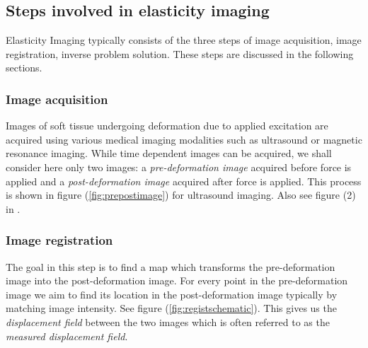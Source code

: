 \documentclass[12pt]{article}
\begin{document}
\subsection{Steps involved in elasticity imaging}
Elasticity Imaging typically consists of the three steps of image acquisition, image registration, inverse problem solution. These steps are discussed in the following sections.
\subsubsection{Image acquisition} Images of soft tissue undergoing deformation due to applied excitation are acquired using various medical imaging modalities such as ultrasound or magnetic resonance imaging. While time dependent images can be acquired, we shall consider here only two images: a \textit{pre-deformation image} acquired before force is applied and a \textit{post-deformation image} acquired after force is applied. This process is shown in figure (\ref{fig:prepostimage}) for ultrasound imaging. Also see figure (2) in \cite{paper:konofagou2004}.
\subsubsection{Image registration} The goal in this step is to find a map which transforms the pre-deformation image into the post-deformation image. For every point in the pre-deformation image we aim to find its location in the post-deformation image typically by matching image intensity. See figure (\ref{fig:registschematic}). This gives us the \textit{displacement field} between the two images which is often referred to as the \textit{measured displacement field}.
\end{document}
